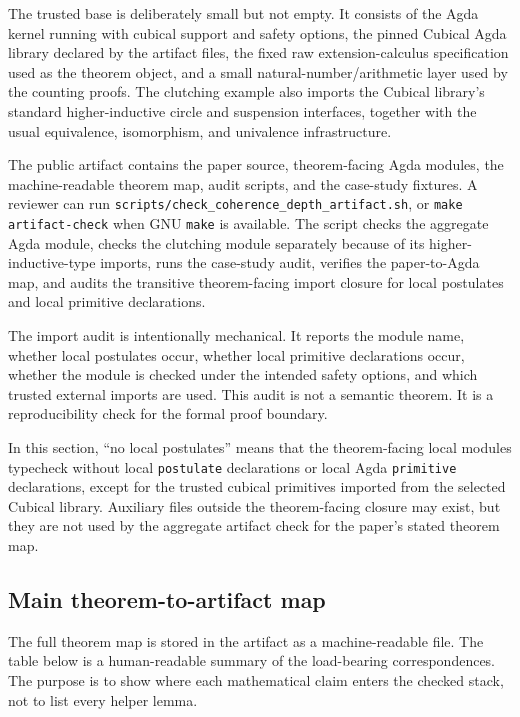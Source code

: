 The trusted base is deliberately small but not empty.  It consists of the Agda kernel running
with cubical support and safety options, the pinned Cubical Agda library declared by the
artifact files, the fixed raw extension-calculus specification used as the theorem object, and a
small natural-number/arithmetic layer used by the counting proofs.  The clutching example also
imports the Cubical library's standard higher-inductive circle and suspension interfaces,
together with the usual equivalence, isomorphism, and univalence infrastructure.

The public artifact contains the paper source, theorem-facing Agda modules, the
machine-readable theorem map, audit scripts, and the case-study fixtures.  A reviewer can run
\texttt{scripts/check\_coherence\_depth\_artifact.sh}, or \texttt{make artifact-check} when
GNU \texttt{make} is available.  The script checks the aggregate Agda module, checks the
clutching module separately because of its higher-inductive-type imports, runs the case-study
audit, verifies the paper-to-Agda map, and audits the transitive theorem-facing import closure
for local postulates and local primitive declarations.

The import audit is intentionally mechanical.  It reports the module name, whether local
postulates occur, whether local primitive declarations occur, whether the module is checked
under the intended safety options, and which trusted external imports are used.  This audit is
not a semantic theorem.  It is a reproducibility check for the formal proof boundary.

\begin{remark}
\label{rem:postulate-free-means}
In this section, ``no local postulates'' means that the theorem-facing local modules typecheck
without local \texttt{postulate} declarations or local Agda \texttt{primitive} declarations,
except for the trusted cubical primitives imported from the selected Cubical library.  Auxiliary
files outside the theorem-facing closure may exist, but they are not used by the aggregate
artifact check for the paper's stated theorem map.
\end{remark}

\subsection{Main theorem-to-artifact map}
\label{subsec:theorem-map}

The full theorem map is stored in the artifact as a machine-readable file.  The table below is a
human-readable summary of the load-bearing correspondences.  The purpose is to show where each
mathematical claim enters the checked stack, not to list every helper lemma.

